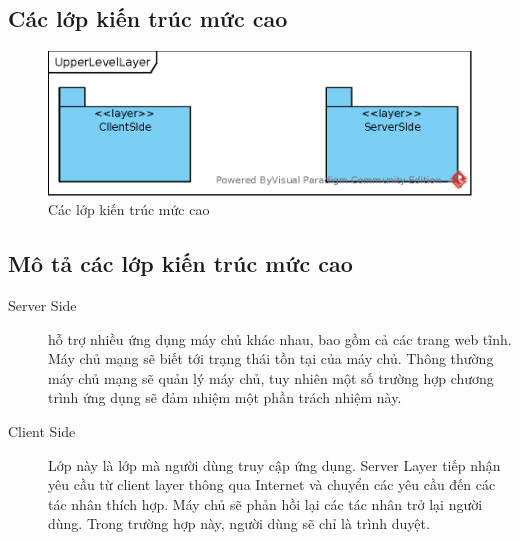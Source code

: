 \documentclass[./../main.tex]{subfiles}
\begin{document}
\subsection{Các lớp kiến trúc mức cao}
\begin{figure}[H]
	\centering
	\includegraphics{./images/UpperLevelLayer.eps}
	\caption{Các lớp kiến trúc mức cao}
\end{figure}

\subsection{Mô tả các lớp kiến trúc mức cao}
\begin{description}
	\item[Server Side] hỗ trợ nhiều ứng dụng máy chủ khác nhau, bao gồm cả các trang web tĩnh. Máy chủ mạng sẽ biết tới trạng thái tồn tại của máy chủ. Thông thường máy chủ mạng sẽ quản lý máy chủ, tuy nhiên một số trường hợp chương trình ứng dụng sẽ đảm nhiệm một phần trách nhiệm này.
	\item[Client Side]  Lớp này là lớp mà người dùng truy cập ứng dụng. Server Layer tiếp nhận yêu cầu từ client layer thông qua Internet và chuyển các yêu cầu đến các tác nhân thích hợp. Máy chủ sẽ phản hồi lại các tác nhân trở lại  người dùng. Trong trường hợp này, người dùng sẽ chỉ là trình duyệt.
\end{description}
\end{document}
